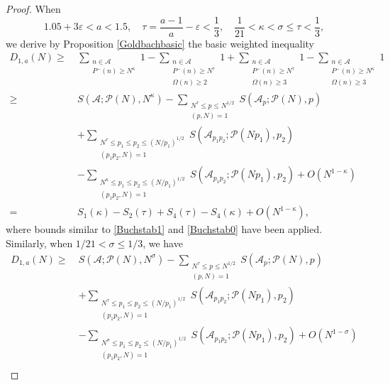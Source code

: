 \documentclass[12pt, a4paper]{amsart}
\def \P {{\mathbb P}}
\def\le{\leqslant}
\def\ge{\geqslant}
\theoremstyle{plain}
\theoremstyle{remark}
\numberwithin{equation}{section}
\begin{document}
\begin{proof}
When 	
$$
1.05+3\varepsilon<a<1.5,\quad \tau=\dfrac{a-1}{a}-\varepsilon<\frac{1}{3}, 
\quad \frac{1}{21}<\kappa<\sigma\le\tau< \frac{1}{3},
$$
we derive by Proposition \ref{Goldbachbasic} the basic weighted inequality
\begin{equation}\label{Goldbachw7}
\begin{split}
D_{1,a}(N)\ge\ & \sum\limits_{\substack{n\in \mathscr{A}\\P^{-}(n)\ge N^\kappa}}1-\sum\limits_{\substack{n\in \mathscr{A}\\P^{-}(n)\ge N^\tau\\\Omega(n)\ge 2}}1+\sum\limits_{\substack{n\in \mathscr{A}\\P^{-}(n)\ge N^\tau\\\Omega(n)\ge 3}}1-\sum\limits_{\substack{n\in \mathscr{A}\\P^{-}(n)\ge N^\kappa\\\Omega(n)\ge 3}}1\\
\ge\ & S(\mathscr{A};\mathscr{P}(N),N^\kappa)-\sum\limits_{\substack{N^\tau\le p\le N^{1/2} \\(p, N)=1}}S(\mathscr{A}_p ; \mathscr{P}(N), p)\\
&+\sum_{\substack{N^\tau \le p_1 \le p_2 \le (N/p_1)^{1/2} \\ (p_1 p_2, N) = 1}}  S(\mathscr{A}_{p_1 p_2}; \mathscr{P}(N p_1), p_2)\\
&-\sum_{\substack{N^\kappa \le p_1 \le p_2 \le (N/p_1)^{1/2} \\ (p_1 p_2, N) = 1}}  S(\mathscr{A}_{p_1 p_2}; \mathscr{P}(N p_1), p_2)+O(N^{1-\kappa})\\
=\ &S_1(\kappa)-S_2(\tau)+S_4(\tau)-S_4(\kappa)+O(N^{1-\kappa}),
\end{split}	
\end{equation}
where bounds similar to \eqref{Buchstab1} and \eqref{Buchstab0} have been applied. 
Similarly, when $1/21<\sigma\le 1/3$, we have
\begin{equation}\label{Goldbachw8}
\begin{split}
D_{1,a}(N)
\ge\ & S(\mathscr{A};\mathscr{P}(N),N^\sigma)-\sum\limits_{\substack{N^\tau\le p\le N^{1/2} \\(p, N)=1}}S(\mathscr{A}_p ; \mathscr{P}(N), p)\\
&+\sum_{\substack{N^\tau \le p_1 \le p_2 \le (N/p_1)^{1/2} \\ (p_1 p_2, N) = 1}}  S(\mathscr{A}_{p_1 p_2}; \mathscr{P}(N p_1), p_2)\\
&-\sum_{\substack{N^\sigma \le p_1 \le p_2 \le (N/p_1)^{1/2} \\ (p_1 p_2, N) = 1}}  S(\mathscr{A}_{p_1 p_2}; \mathscr{P}(N p_1), p_2)+O(N^{1-\sigma})\\

\end{split}
\end{equation}
\end{proof}
\end{document}

